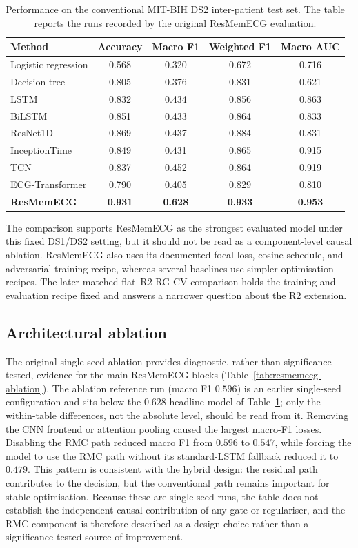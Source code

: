 \documentclass[pdflatex,sn-mathphys-num]{sn-jnl}
\begin{document}
\begin{table}[htbp]
\caption{Performance on the conventional MIT-BIH DS2 inter-patient test set.
The table reports the runs recorded by the original ResMemECG evaluation.}
\label{tab:performance}
\centering
\begin{tabular}{@{}lcccc@{}}
\toprule
Method & Accuracy & Macro F1 & Weighted F1 & Macro AUC \\
\midrule
Logistic regression & 0.568 & 0.320 & 0.672 & 0.716 \\
Decision tree & 0.805 & 0.376 & 0.831 & 0.621 \\
LSTM & 0.832 & 0.434 & 0.856 & 0.863 \\
BiLSTM & 0.851 & 0.433 & 0.864 & 0.833 \\
ResNet1D & 0.869 & 0.437 & 0.884 & 0.831 \\
InceptionTime~\cite{ref27} & 0.849 & 0.431 & 0.865 & 0.915 \\
TCN & 0.837 & 0.452 & 0.864 & 0.919 \\
ECG-Transformer & 0.790 & 0.405 & 0.829 & 0.810 \\
\textbf{ResMemECG} & \textbf{0.931} & \textbf{0.628} & \textbf{0.933} & \textbf{0.953} \\
\bottomrule
\end{tabular}
\end{table}

The comparison supports ResMemECG as the strongest evaluated model under this
fixed DS1/DS2 setting, but it should not be read as a component-level causal
ablation. ResMemECG also uses its documented focal-loss, cosine-schedule, and
adversarial-training recipe, whereas several baselines use simpler optimisation
recipes. The later matched flat--R2 RG-CV comparison holds the training and
evaluation recipe fixed and answers a narrower question about the R2 extension.

\subsection{Architectural ablation}
The original single-seed ablation provides diagnostic, rather than
significance-tested, evidence for the main ResMemECG blocks
(Table~\ref{tab:resmemecg-ablation}). The ablation reference run (macro F1
$0.596$) is an earlier single-seed configuration and sits below the $0.628$
headline model of Table~\ref{tab:performance}; only the within-table differences,
not the absolute level, should be read from it. Removing the CNN frontend or
attention pooling caused the largest macro-F1 losses. Disabling the RMC path
reduced macro F1 from $0.596$ to $0.547$, while forcing the model to use the RMC
path without its standard-LSTM fallback reduced it to $0.479$. This pattern is
consistent with the hybrid design: the residual path contributes to the
decision, but the conventional path remains important for stable optimisation.
Because these are single-seed runs, the table does not establish the
independent causal contribution of any gate or regulariser, and the RMC
component is therefore described as a design choice rather than a
significance-tested source of improvement.
\end{document}
